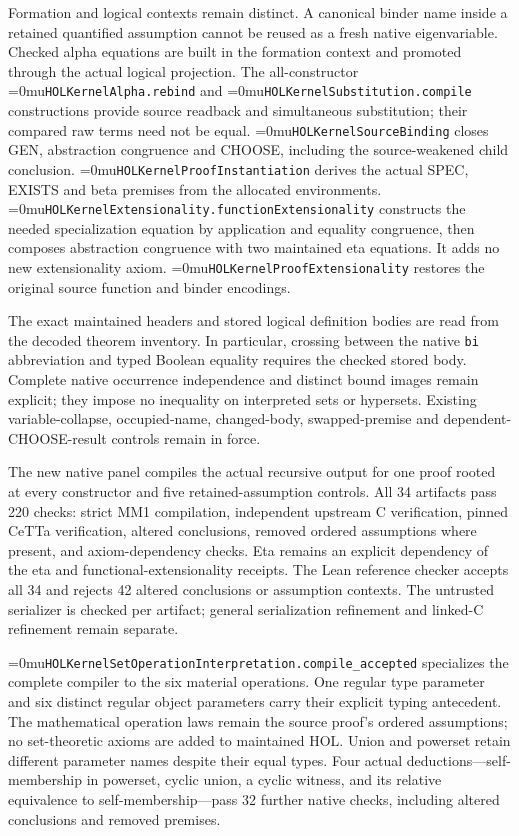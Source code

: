 \documentclass[11pt]{article}
\newcommand{\leanname}[1]{\textup{\Urlmuskip=0mu\relax\nolinkurl{#1}}}
\theoremstyle{definition}
\theoremstyle{remark}
\newcommand{\code}[1]{\texttt{#1}}
\begin{document}
\begin{enumerate}[leftmargin=*]
  Formation and logical contexts remain distinct. A canonical binder name
  inside a retained quantified assumption cannot be reused as a fresh native
  eigenvariable. Checked alpha equations are built in the formation context
  and promoted through the actual logical projection. The all-constructor
  \leanname{HOLKernelAlpha.rebind} and \leanname{HOLKernelSubstitution.compile}
  constructions provide source readback and simultaneous substitution;
  their compared raw terms need not be equal. \leanname{HOLKernelSourceBinding}
  closes GEN, abstraction congruence and CHOOSE, including the source-weakened
  child conclusion. \leanname{HOLKernelProofInstantiation} derives the actual
  SPEC, EXISTS and beta premises from the allocated environments.
  \leanname{HOLKernelExtensionality.functionExtensionality} constructs the
  needed specialization equation by application and equality congruence, then
  composes abstraction congruence with two maintained eta equations. It adds
  no new extensionality axiom. \leanname{HOLKernelProofExtensionality} restores
  the original source function and binder encodings.

  The exact maintained headers and stored logical definition bodies are read
  from the decoded theorem inventory. In particular, crossing between the
  native \code{bi} abbreviation and typed Boolean equality requires the
  checked stored body. Complete native occurrence independence and distinct
  bound images remain explicit; they impose no inequality on interpreted
  sets or hypersets. Existing variable-collapse, occupied-name, changed-body,
  swapped-premise and dependent-CHOOSE-result controls remain in force.

  The new native panel compiles the actual recursive output for one proof
  rooted at every constructor and five retained-assumption controls. All 34
  artifacts pass 220 checks: strict MM1 compilation, independent upstream C
  verification, pinned CeTTa verification, altered conclusions, removed ordered
  assumptions where present, and axiom-dependency checks. Eta remains an explicit
  dependency of the eta and functional-extensionality receipts. The Lean
  reference checker accepts all 34 and rejects 42 altered conclusions or
  assumption contexts. The untrusted serializer is checked per artifact;
  general serialization refinement and linked-C refinement remain separate.

  \leanname{HOLKernelSetOperationInterpretation.compile_accepted} specializes
  the complete compiler to the six material operations. One regular type
  parameter and six distinct regular object parameters carry their explicit
  typing antecedent. The mathematical operation laws remain the source proof's
  ordered assumptions; no set-theoretic axioms are added to maintained HOL.
  Union and powerset retain different parameter names despite their equal types.
  Four actual deductions---self-membership in powerset, cyclic union, a cyclic
  witness, and its relative equivalence to self-membership---pass 32 further
  native checks, including altered conclusions and removed premises.


\end{enumerate}
\end{document}
